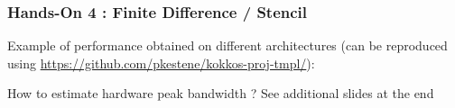 \begin{frame}
  \frametitle{Hands-On 4 : Finite Difference / Stencil}

  Example of performance obtained on different architectures (can be reproduced using \url{https://github.com/pkestene/kokkos-proj-tmpl/}):

  {How to estimate hardware peak bandwidth ? See additional slides at the end}
  
  \begin{itemize}
\end{itemize}
\end{frame}
